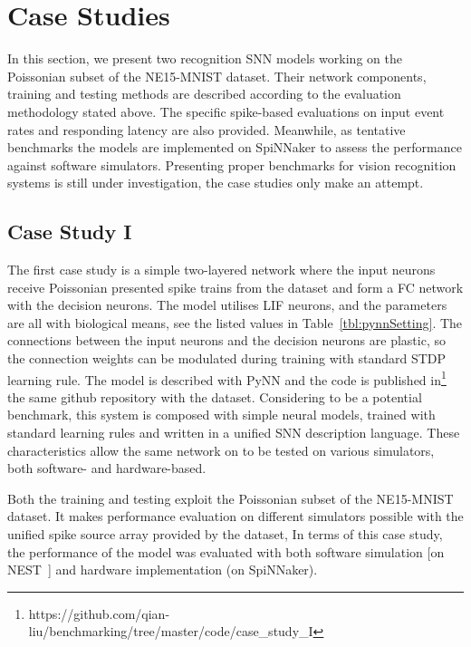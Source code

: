 \section{Case Studies}
\label{sec:test}
In this section, we present two recognition SNN models working on the Poissonian subset of the NE15-MNIST dataset.
Their network components, training and testing methods are described according to the evaluation methodology stated above.
The specific spike-based evaluations on input event rates and responding latency are also provided. 
Meanwhile, as tentative benchmarks the models are implemented on SpiNNaker to assess the performance against software simulators.
Presenting proper benchmarks for vision recognition systems is still under investigation, the case studies only make an attempt.

\subsection{Case Study I}
The first case study is a simple two-layered network where the input neurons receive Poissonian presented spike trains from the dataset and form a FC network with the decision neurons.
The model utilises LIF neurons, and the parameters are all with biological means, see the listed values in Table~\ref{tbl:pynnSetting}.
The connections between the input neurons and the decision neurons are plastic, so the connection weights can be modulated during training with standard STDP learning rule.
The model is described with PyNN and the code is published in\footnote {https://github.com/qian-liu/benchmarking/tree/master/code/case\_study\_I} the same github repository with the dataset.
Considering to be a potential benchmark, this system is composed with simple neural models, trained with standard learning rules and written in a unified SNN description language. These characteristics allow the same network on to be tested on various simulators, both software- and hardware-based.

Both the training and testing exploit the Poissonian subset of the NE15-MNIST dataset.
It makes performance evaluation on different simulators possible with the unified spike source array provided by the dataset, 
In terms of this case study, the performance of the model was evaluated with both software simulation [on NEST~\citep{gewaltig2007nest}] and hardware implementation (on SpiNNaker).

